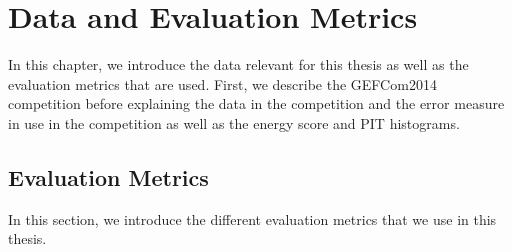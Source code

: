 \chapter{Data and Evaluation Metrics}
\label{ch:data-evaluation}

In this chapter, we introduce the data relevant for this thesis 
as well as the evaluation metrics that are used. 
First, we describe the GEFCom2014 competition before explaining  
the data in the competition and the error measure in use in the competition as well as the 
energy score and PIT histograms. 



\section{Evaluation Metrics}

In this section, we introduce the different evaluation metrics that we use in this thesis.





